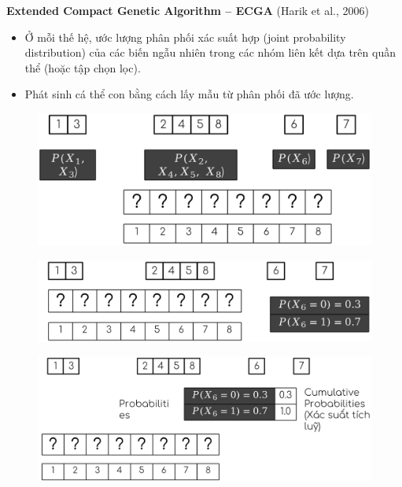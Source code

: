 \documentclass{book}
\begin{document}
            \textbf{Extended Compact Genetic Algorithm – ECGA} (Harik et al., 2006)
            \begin{itemize}
                \item Ở mỗi thế hệ, ước lượng phân phối xác suất hợp (joint probability distribution) của các biến ngẫu nhiên trong các nhóm liên kết dựa trên quần thể (hoặc tập chọn lọc).
                \item Phát sinh cá thể con bằng cách lấy mẫu từ phân phối đã ước lượng.
            \end{itemize}
            \begin{figure}[H]
                \centering
                \includegraphics[width=0.7\linewidth]{images/ecga1.png}
                \label{fig:ecga1}
            \end{figure}
            \begin{figure}[H]
                \centering
                \includegraphics[width=0.7\linewidth]{images/ecga2.png}
                \label{fig:ecga2}
            \end{figure}
            \begin{figure}[H]
                \centering
                \includegraphics[width=0.7\linewidth]{images/ecga3.png}
                \label{fig:ecga3}
            \end{figure}
\end{document}
